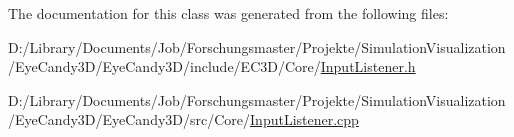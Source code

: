 The documentation for this class was generated from the following files\+:\begin{DoxyCompactItemize}
\item 
D\+:/\+Library/\+Documents/\+Job/\+Forschungsmaster/\+Projekte/\+Simulation\+Visualization/\+Eye\+Candy3\+D/\+Eye\+Candy3\+D/include/\+E\+C3\+D/\+Core/\mbox{\hyperlink{_input_listener_8h}{Input\+Listener.\+h}}\item 
D\+:/\+Library/\+Documents/\+Job/\+Forschungsmaster/\+Projekte/\+Simulation\+Visualization/\+Eye\+Candy3\+D/\+Eye\+Candy3\+D/src/\+Core/\mbox{\hyperlink{_input_listener_8cpp}{Input\+Listener.\+cpp}}\end{DoxyCompactItemize}
